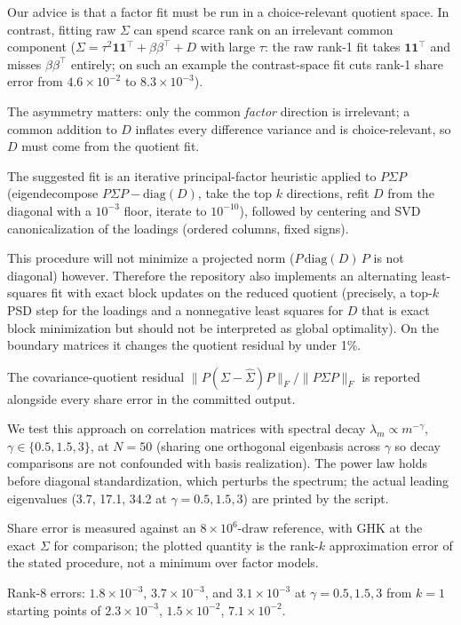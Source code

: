 \documentclass[12pt]{article}
\theoremstyle{remark}
\begin{document}
Our advice is that a factor fit must be run in a choice-relevant
quotient space. In contrast, fitting raw $\Sigma$ can spend
scarce rank on an irrelevant common component ($\Sigma = \tau^2
\mathbf{1}\mathbf{1}^\top + \beta\beta^\top + D$ with large $\tau$: the
raw rank-1 fit takes $\mathbf{1}\mathbf{1}^\top$ and misses
$\beta\beta^\top$ entirely; on such an example the contrast-space fit cuts
rank-1 share error from $4.6\times10^{-2}$ to $8.3\times10^{-3}$).

The asymmetry matters: only the common \emph{factor} direction is irrelevant; a
common addition to $D$ inflates every difference variance and is
choice-relevant, so $D$ must come from the quotient fit.

The suggested fit is an iterative principal-factor heuristic applied to $P\Sigma P$ (eigendecompose
$P\Sigma P - \mathrm{diag}(D)$, take the top $k$ directions, refit $D$ from
the diagonal with a $10^{-3}$ floor, iterate to $10^{-10}$), followed by
centering and SVD canonicalization of the loadings (ordered columns, fixed
signs).

This procedure will not minimize a projected norm ($P\,\mathrm{diag}(D)\,P$
is not diagonal) however. Therefore the repository also implements an alternating least-squares fit with
exact block updates on the reduced quotient (precisely, a top-$k$ PSD step for the
loadings and a nonnegative least squares for $D$ that is exact block
minimization but should not be interpreted as global optimality). On
the boundary matrices it changes the quotient residual by under 1\%.

The covariance-quotient residual $\|P(\Sigma -
\hat\Sigma)P\|_F / \|P\Sigma P\|_F$ is reported alongside every share
error in the committed output.

We test this approach on correlation matrices with spectral decay
$\lambda_m \propto m^{-\gamma}$, $\gamma \in \{0.5, 1.5, 3\}$, at
$N=50$ (sharing one
orthogonal eigenbasis across $\gamma$ so decay comparisons are not
confounded with basis realization). The power law holds before diagonal
standardization, which perturbs the spectrum; the actual leading eigenvalues
(3.7, 17.1, 34.2 at $\gamma = 0.5, 1.5, 3$) are printed by the script.

Share error is measured against an $8\times10^6$-draw reference, with GHK
at the exact $\Sigma$ for comparison; the plotted quantity is the rank-$k$
approximation error of the stated procedure, not a minimum over factor
models.

Rank-8 errors: $1.8\times10^{-3}$, $3.7\times10^{-3}$, and
$3.1\times10^{-3}$ at $\gamma = 0.5, 1.5, 3$ from $k=1$ starting points of
$2.3\times10^{-3}$, $1.5\times10^{-2}$, $7.1\times10^{-2}$.
\end{document}
